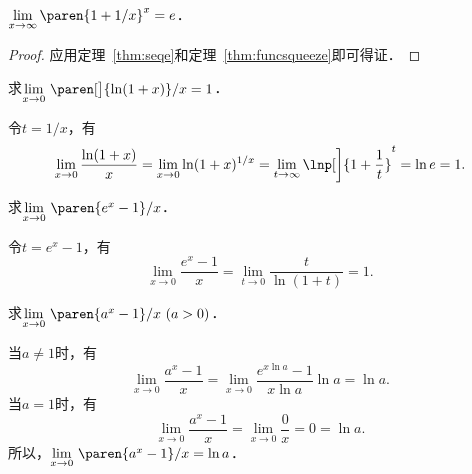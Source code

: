\begin{theorem*}
  \(\lim\limits_{x\to\infty} \paren{1 + 1/x}^x = e\)． %

  \begin{proof}
    应用定理~\ref{thm:seqe}和定理~\ref{thm:funcsqueeze}即可得证．
  \end{proof}
\end{theorem*}

\begin{example*}
  求\(\lim\limits_{x\to0} \,\paren[\big]{\ln(1+x)}/{x} = 1\)． %

  \begin{remark}
    令\(t = 1/x\)，有
    \begin{equation*}
      \lim_{x\to0} \frac{\ln(1+x)}{x}
      = \lim_{x\to0} \ln(1+x)^{1/x}
      = \lim_{t\to\infty} \lnp[\bigg]{1 + \frac1t}^t
      = \ln e
      = 1.
    \end{equation*}
  \end{remark}
\end{example*}

\begin{example*}
  求\(\lim\limits_{x\to0} \,\paren{e^x-1}/{x}\)．

  \begin{remark}
    令\(t = e^x - 1\)，有
    \begin{equation*}
      \lim_{x\to0} \frac{e^x-1}{x}
      = \lim_{t\to0} \frac{t}{\ln(1+t)}
      = 1.
    \end{equation*}
  \end{remark}
\end{example*}

\begin{example*}
  求\(\lim\limits_{x\to0} \,\paren{a^x-1}/{x}\ (a > 0)\)．

  \begin{remark}
    当\(a \ne 1\)时，有
    \begin{equation*}
      \lim_{x\to0} \frac{a^x-1}{x}
      = \lim_{x\to0} \frac{e^{x \ln a}-1}{x \ln a} \ln a
      = \ln a.
    \end{equation*}
    当\(a = 1\)时，有
    \begin{equation*}
      \lim_{x\to0} \frac{a^x-1}{x}
      = \lim_{x\to0} \frac{0}{x}
      = 0 = \ln a.
    \end{equation*}
    所以，\(\lim\limits_{x\to0} \,\paren{a^x-1}/{x} = \ln a\)．
  \end{remark}
\end{example*}

